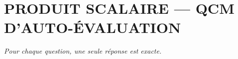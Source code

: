 
\section*{\textcolor{chapcolor}{\MakeUppercase{Produit scalaire — QCM d'auto-évaluation}}}

\begin{center}
\textit{Pour chaque question, une seule réponse est exacte.}
\end{center}

